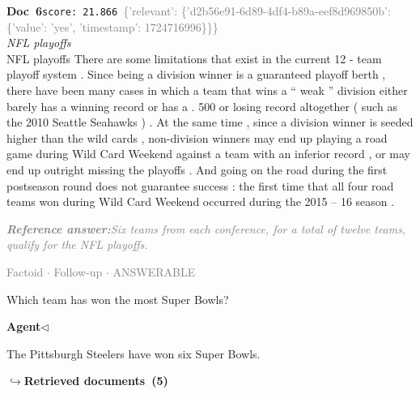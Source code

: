 \documentclass[a4paper,11pt]{article}
\begin{document}
\begin{docenv}
{\footnotesize\textcolor{doccolor}{\textbf{Doc~6}}}\hfill{\tiny\texttt{score:~21.866}}\ {\tiny\textcolor{gray}{\{'relevant': \{'d2b56e91-6d89-4df4-b89a-eef8d969850b': \{'value': 'yes', 'timestamp': 1724716996\}\}\}}}\\[3pt]
{\small\textit{NFL playoffs}}\\[2pt]
\vspace{2pt}
{\footnotesize NFL playoffs
There are some limitations that exist in the current 12 - team playoff system . Since being a division winner is a guaranteed playoff berth , there have been many cases in which a team that wins a `` weak '' division either barely has a winning record or has a . 500 or losing record altogether ( such as the 2010 Seattle Seahawks ) . At the same time , since a division winner is seeded higher than the wild cards , non-division winners may end up playing a road game during Wild Card Weekend against a team with an inferior record , or may end up outright missing the playoffs . And going on the road during the first postseason round does not guarantee success : the first time that all four road teams won during Wild Card Weekend occurred during the 2015 -- 16 season .}
\end{docenv}
\begin{refanswerenv}
{\footnotesize\textit{\textcolor{gray}{\textbf{Reference answer:}\enspace Six teams from each conference, for a total of twelve teams, qualify for the NFL playoffs.}}}
\end{refanswerenv}
\vspace{0.5em}
\hfill{\tiny\textcolor{gray}{Factoid $\cdot$ Follow-up $\cdot$ ANSWERABLE}}
\begin{userbubble}
Which team has won the most Super Bowls?
\end{userbubble}
\noindent\hfill{\small\textcolor{agentcolor}{\textbf{Agent\enspace$\triangleleft$}}}
\begin{agentbubble}
The Pittsburgh Steelers have won six Super Bowls.
\end{agentbubble}
\noindent\hfill{\footnotesize\textcolor{doccolor}{\textbf{$\hookrightarrow$\enspace Retrieved documents~(5)}}}
\end{document}
